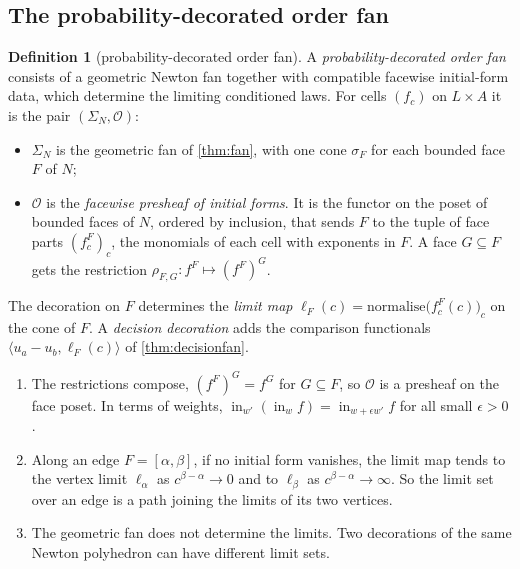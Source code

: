 \documentclass[11pt]{article}
\theoremstyle{definition}\newtheorem{definition}[theorem]{Definition}\newtheorem{remark}[theorem]{Remark}\newtheorem{example}[theorem]{Example}
\begin{document}
\subsection{The probability-decorated order fan}
\begin{definition}[probability-decorated order fan]\label{def:decorated}
A \emph{probability-decorated order fan} consists of a geometric Newton fan together with compatible facewise initial-form data, which
determine the limiting conditioned laws. For cells $(f_c)$ on $L\times A$ it is the pair $(\Sigma_N,\mathcal O)$:
\begin{itemize}
\item $\Sigma_N$ is the geometric fan of \cref{thm:fan}, with one cone $\sigma_F$ for each bounded face $F$ of $N$;
\item $\mathcal O$ is the \emph{facewise presheaf of initial forms}. It is the functor on the poset of bounded faces of $N$, ordered by inclusion,
  that sends $F$ to the tuple of face parts $(f^F_c)_c$, the monomials of each cell with exponents in $F$. A face $G\subseteq F$ gets the
  restriction $\rho_{F,G}:f^F\mapsto(f^F)^G$.
\end{itemize}
The decoration on $F$ determines the \emph{limit map} $\ell_F(c)=\text{normalise}\bigl(f^F_c(c)\bigr)_c$ on the cone of $F$. A \emph{decision
decoration} adds the comparison functionals $\langle u_a-u_b,\ell_F(c)\rangle$ of \cref{thm:decisionfan}.
\end{definition}

\begin{proposition}\label{prop:decorated}
\begin{enumerate}
\item[(1)] The restrictions compose, $(f^F)^G=f^G$ for $G\subseteq F$, so $\mathcal O$ is a presheaf on the face poset. In terms of weights,
  $\operatorname{in}_{w'}(\operatorname{in}_wf)=\operatorname{in}_{w+\epsilon w'}f$ for all small $\epsilon>0$.
\item[(2)] Along an edge $F=[\alpha,\beta]$, if no initial form vanishes, the limit map tends to the vertex limit $\ell_\alpha$ as
  $c^{\beta-\alpha}\to0$ and to $\ell_\beta$ as $c^{\beta-\alpha}\to\infty$. So the limit set over an edge is a path joining the limits of its two vertices.
\item[(3)] The geometric fan does not determine the limits. Two decorations of the same Newton polyhedron can have different limit sets.
\end{enumerate}
\end{proposition}
\end{document}
